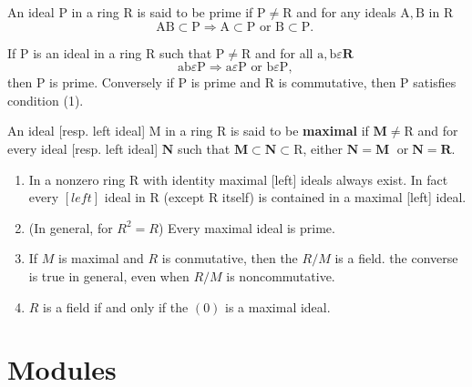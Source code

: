 An ideal P in a ring R is said to be prime if $\mathrm{P} \neq \mathrm{R}$ and for any ideals $\mathrm{A}, \mathrm{B}$ in R
$$
\mathrm{AB} \subset \mathrm{P} \Rightarrow \mathrm{A} \subset \mathrm{P} \text { or } \mathrm{B} \subset \mathrm{P} \text {. }
$$
\begin{theo}
If P is an ideal in a ring R such that $\mathrm{P} \neq \mathrm{R}$ and for all $\mathrm{a}, \mathrm{b} \varepsilon \mathbf{R}$
$$
\mathrm{ab} \varepsilon \mathrm{P} \Rightarrow \mathrm{a} \varepsilon \mathrm{P} \text { or } \mathrm{b} \varepsilon \mathrm{P} \text {, }
$$
then P is prime. Conversely if P is prime and R is commutative, then P satisfies condition (1).
\end{theo}

An ideal [resp. left ideal] M in a ring R is said to be \textbf{maximal} if $\mathbf{M} \neq \mathrm{R}$ and for every ideal [resp. left ideal] $\mathbf{N}$ such that $\mathbf{M} \subset \mathbf{N} \subset \mathrm{R}$, either $\mathbf{N}=\mathbf{M}$ $\operatorname{or} \mathbf{N}=\mathbf{R}$.

\begin{theo}
    \begin{enumerate}
        \item In a nonzero ring R with identity maximal [left] ideals always exist. In fact every $[l e f t]$ ideal in R (except R itself) is contained in a maximal [left] ideal.
        \item (In general, for $R^2 = R$) Every maximal ideal is prime. 
        \item If $M$ is maximal and $R$ is conmutative, then the $R/M$ is a field. the converse is true in general, even when $R/M$ is noncommutative.
        \item $R$ is a field if and only if the $(0)$ is a maximal ideal.
    \end{enumerate}
\end{theo}






\section{Modules}

